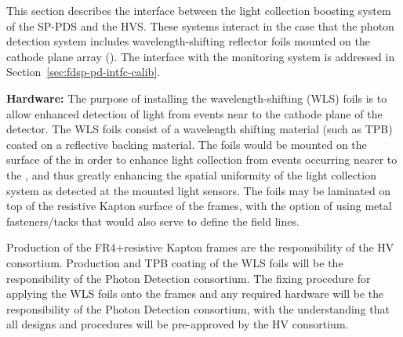 

This section describes the interface between the light collection boosting system of the SP-PDS  and the HVS. These systems interact in the case that the photon detection system includes wavelength-shifting reflector foils mounted on the cathode plane array (). The interface with the monitoring system is addressed in Section~\ref{sec:fdsp-pd-intfc-calib}.

\textbf{Hardware: }The purpose of installing the wavelength-shifting (WLS) foils is to allow enhanced detection of light from events near to the cathode plane of the detector. The WLS foils consist of a wavelength shifting material (such as TPB) coated on a reflective backing material. The foils would be mounted on the surface of the  in order to enhance light collection from events occurring nearer to the , and thus greatly enhancing the spatial uniformity of the light collection system as detected at the  mounted light sensors. The foils may be laminated on top of the resistive Kapton surface of the  frames, with the option of using metal fasteners/tacks that would also serve to define the field lines. 

Production of the FR4+resistive Kapton  frames are the responsibility of the HV consortium. Production and TPB coating of the WLS foils will be the responsibility of the Photon Detection consortium. The fixing procedure for applying the WLS foils onto the  frames and any required hardware will be the responsibility of the Photon Detection consortium, with the understanding that all designs and procedures will be pre-approved by the HV consortium. 

